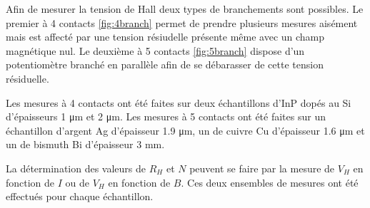 \begin{minipage}{\textwidth}
    Afin de mesurer la tension de Hall deux types de branchements sont possibles. Le premier à 4 contacts \autoref{fig:4branch} permet de prendre plusieurs mesures aisément mais est affecté par une tension résiudelle présente même avec un champ magnétique nul. Le deuxième à 5 contacts \autoref{fig:5branch} dispose d'un potentiomètre branché en parallèle afin de se débarasser de cette tension résiduelle. 
    
    Les mesures à 4 contacts ont été faites sur deux échantillons d'InP dopés au Si d'épaisseurs 1 \si{\micro\meter} et 2 \si{\micro\meter}. Les mesures à 5 contacts ont été faites sur un échantillon d'argent Ag d'épaisseur 1.9 \si{\micro \meter}, un de cuivre Cu d'épaisseur 1.6 \si{\micro \meter} et un de bismuth Bi d'épaisseur 3 \si{\milli \meter}.

    La détermination des valeurs de \(R_H\) et \(N\) peuvent se faire par la mesure de \(V_H\) en fonction de \(I\) ou de \(V_H\) en fonction de \(B\). Ces deux ensembles de mesures ont été effectués pour chaque échantillon.
    
\end{minipage}